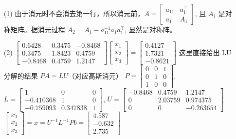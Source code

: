 \documentclass{article}
\begin{document}
\begin{itemize}
    \begin{itemize}
        \item [(1)] 由于消元时不会消去第一行，所以消元前，$A = \left[\begin{array}{cc}a_{11}&a_1^\top\\a_1&A_1\end{array}\right]$, 且 $A_1$ 是对称矩阵。据消元过程 $A_2 = A_1 - a_{11}^{-1}a_1a_1^\top$, 显然是对称阵。 
        \item [(2)] $\left[\begin{array}{ccc}
            0.6428 & 0.3475 & -0.8468 \\ 0.3475 & 1.8423 & 0.4759 \\ -0.8468 & 0.4759 & 1.2147
        \end{array}\right] \left[\begin{array}{c}x_1\\x_2\\x_3\end{array}\right] = \left[
            \begin{array}{c}
                0.4127 \\ 1.7321 \\ -0.8621
            \end{array}
        \right]$
        这里直接给出 LU 分解的结果 $PA = LU$（对应高斯消元）
        $P = \left[\begin{array}{ccc}
            0 &   0 &   1 \\   0 &   1 &   0 \\   1 &   0 &   0
      \end{array}\right]$, $L=\left[\begin{array}{ccc}
        1 &   0 &   0 \\ -0.410368 &   1 &   0 \\ -0.759093 & 0.347838 &   1
        \end{array}\right]$,
        $U = \left[\begin{array}{ccc}
            -0.8468 & 0.4759 & 1.2147 \\   0 & 2.03759 & 0.974375 \\   0 &   0 & -0.263654
        \end{array}\right]$
        $\left[\begin{array}{c}x_1\\x_2\\x_3\end{array}\right] = x = U^{-1}L^{-1}Pb = \left[\begin{array}{c}
            4.587 \\ -0.632 \\ 2.735
        \end{array}\right]$
    \end{itemize}


\end{itemize}
\end{document}
